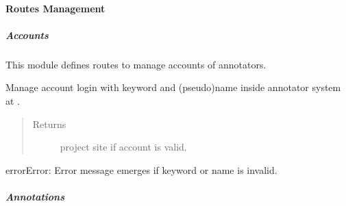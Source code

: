 \documentclass[a4paper,12pt,english]{sphinxmanual}
\begin{document}
\paragraph{Routes Management}
\label{\detokenize{project_rst/annotator_rst/routes:module-project.annotator.account}}\label{\detokenize{project_rst/annotator_rst/routes:routes-management}}\label{\detokenize{project_rst/annotator_rst/routes::doc}}

\subparagraph{Accounts}
\label{\detokenize{project_rst/annotator_rst/routes:accounts}}
 

This module defines routes to manage accounts of annotators.

\begin{fulllineitems}
\label{\detokenize{project_rst/annotator_rst/routes:project.annotator.account.login}}
Manage account login with keyword and (pseudo)name inside annotator system at .
\begin{quote}\begin{description}
\item[{Returns}] \leavevmode
project site  if account is valid.

\end{description}\end{quote}

\begin{sphinxadmonition}{error}{Error:}
Error message emerges if keyword or name is invalid.
\end{sphinxadmonition}

\end{fulllineitems}

\label{\detokenize{project_rst/annotator_rst/routes:module-project.annotator.annotation}}

\subparagraph{Annotations}
\label{\detokenize{project_rst/annotator_rst/routes:annotations}}
 
\end{document}
